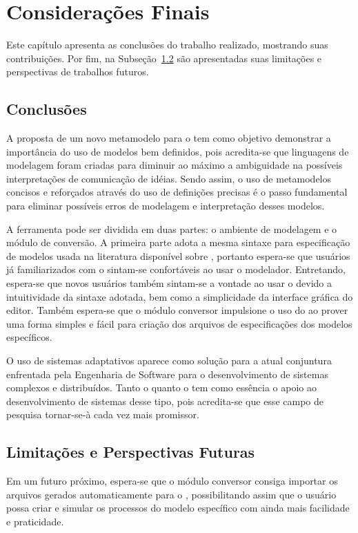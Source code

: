 \chapter{Considerações Finais}
\label{sec-conclusoes}

Este capítulo apresenta as conclusões do trabalho realizado, mostrando suas contribuições. Por fim, na Subseção~\ref{sec-consideracoes-finais-limitacoes-perspectivas} são apresentadas suas limitações e perspectivas de trabalhos futuros.

\section{Conclusões}
\label{sec-consideracoes-finais-conclusoes}

A proposta de um novo metamodelo para o \zanshin tem como objetivo demonstrar a importância do uso de modelos bem definidos, pois acredita-se que linguagens de modelagem foram criadas para diminuir ao máximo a ambiguidade na possíveis interpretações de comunicação de idéias. Sendo assim, o uso de metamodelos concisos e reforçados através do uso de definições precisas é o passo fundamental para eliminar possíveis erros de modelagem e interpretação desses modelos.

A ferramenta \unagi pode ser dividida em duas partes: o ambiente de modelagem e o módulo de conversão. A primeira parte adota a mesma sintaxe para especificação de modelos usada na literatura disponível sobre \zanshin, portanto espera-se que usuários já familiarizados com o \framework sintam-se confortáveis ao usar o modelador. Entretando, espera-se que novos usuários também sintam-se a vontade ao usar o \unagi devido a intuitividade da sintaxe adotada, bem como a simplicidade da interface gráfica do editor. Também espera-se que o módulo conversor impulsione o uso do \zanshin ao prover uma forma simples e fácil para criação dos arquivos de especificações dos modelos específicos. 

O uso de sistemas adaptativos aparece como solução para a atual conjuntura enfrentada pela Engenharia de Software para o desenvolvimento de sistemas complexos e distribuídos. Tanto o \zanshin quanto o \unagi tem como essência o apoio ao desenvolvimento de sistemas desse tipo, pois acredita-se que esse campo de pesquisa tornar-se-à cada vez mais promissor.


\section{Limitações e Perspectivas Futuras}
\label{sec-consideracoes-finais-limitacoes-perspectivas}
Em um futuro próximo, espera-se que o módulo conversor consiga importar os arquivos gerados automaticamente para o \zanshin, possibilitando assim que o usuário possa criar e simular os processos do modelo específico com ainda mais facilidade e praticidade. 